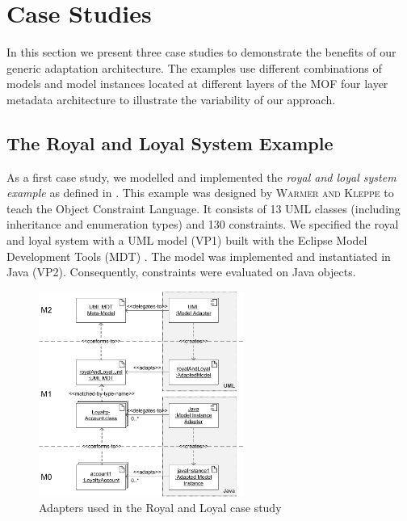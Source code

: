 \section{Case Studies}
\label{sec:caseStudies}
In this section we present three case studies to demonstrate the benefits of our
generic adaptation architecture. The examples use different combinations of models
and model instances located at different layers of the MOF four layer metadata architecture
to illustrate the variability of our approach.


\subsection{The Royal and Loyal System Example}

As a first case study, we modelled and implemented the \textit{royal and loyal system example} 
as defined in \cite{warmer:ocl}. This example was designed by \textsc{Warmer
and Kleppe} to teach the Object Constraint Language. It consists of
13 UML classes (including inheritance and enumeration types) and 130 constraints. 
We specified the royal and loyal system with a UML model (VP1) built with the
Eclipse Model Development Tools (MDT) \cite{WWW:MDT}.
The model was implemented and instantiated in Java (VP2). 
Consequently, constraints were evaluated on Java objects.

\begin{figure}[!t]
	\centering
		\includegraphics[width=0.60\textwidth]{figures/casestudy01.pdf}
	\caption{
	Adapters used in the Royal and Loyal case study
	  }
	\label{fig:casestudy01}
\end{figure}

